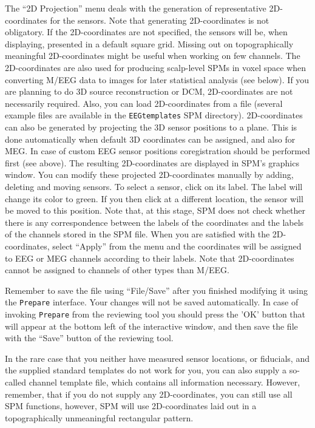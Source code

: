 The ``2D Projection'' menu deals with the generation of representative 2D-coordinates for the sensors. Note that generating 2D-coordinates is
not obligatory. If the 2D-coordinates are not specified, the sensors will be, when displaying, presented in a default square grid. Missing out
on topographically meaningful 2D-coordinates might be useful when working on few channels. The 2D-coordinates are also used for producing scalp-level SPMs in voxel space when converting M/EEG data to images for later statistical analysis (see below). If you are
planning to do 3D source reconstruction or DCM, 2D-coordinates are not necessarily required. Also, you can load 2D-coordinates from a file (several example files are available in the \texttt{EEGtemplates} SPM directory). 2D-coordinates can also be generated by projecting the 3D sensor positions to a plane. This is done automatically when default 3D coordinates can be assigned, and also for MEG. In case of custom EEG sensor positions coregistration should be performed first (see above). The resulting 2D-coordinates are displayed in SPM's graphics window. You can modify these projected 2D-coordinates manually by adding, deleting and moving sensors. To select a sensor, click on its label. The label will change its color to green. If you then click at a different location, the sensor will be moved to this position. Note that, at this stage, SPM does not check whether there is any correspondence between the labels of the coordinates and the labels of the channels stored in the SPM file. When you are satisfied with the 2D-coordinates, select ``Apply'' from the menu and the coordinates will be assigned to EEG or MEG channels according to their labels. Note that 2D-coordinates cannot be assigned to channels of other types than M/EEG.

Remember to save the file using ``File/Save'' after you finished modifying it using the \texttt{Prepare} interface. Your changes will not be saved automatically. In case of invoking \texttt{Prepare} from the reviewing tool you should press the 'OK' button that will appear at the bottom left of the interactive window, and then save the file with the ``Save'' button of the reviewing tool.

In the rare case that you neither have measured sensor locations, or fiducials, and the supplied standard templates do not work for you, you can also supply a so-called channel template file, which contains all information necessary. However, remember, that if you do not supply any 2D-coordinates, you can still use all SPM functions, however, SPM will use 2D-coordinates laid out in a topographically unmeaningful rectangular pattern.

